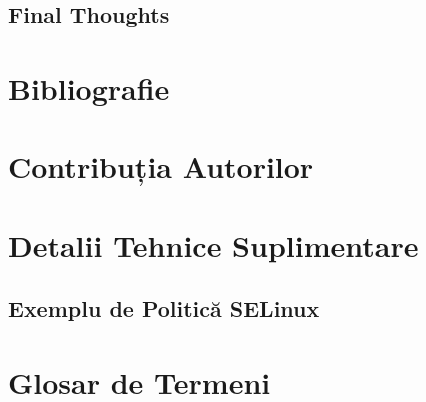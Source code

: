 \documentclass[11pt,a4paper,twocolumn]{article}
\theoremstyle{definition}
\theoremstyle{plain}
\theoremstyle{remark}
\begin{document}
\subsection{Final Thoughts}

\section{Bibliografie}

\section*{Contribuția Autorilor}

\printbibliography

\appendix

\section{Detalii Tehnice Suplimentare}

\subsection{Exemplu de Politică SELinux}

\section{Glosar de Termeni}
\end{document}
